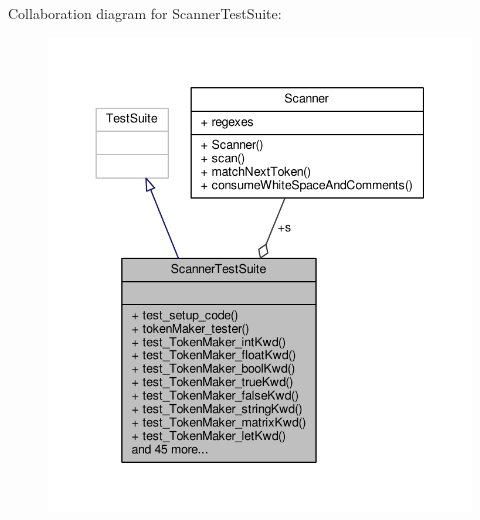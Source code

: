 Collaboration diagram for Scanner\-Test\-Suite\-:\nopagebreak
\begin{figure}[H]
\begin{center}
\leavevmode
\includegraphics[width=347pt]{classScannerTestSuite__coll__graph}
\end{center}
\end{figure}
